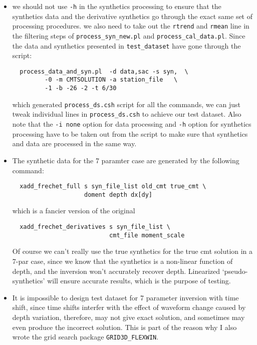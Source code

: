 \documentclass[12pt,titlepage,fleqn]{article}
\begin{document}
\begin{itemize}
\item  we should not use \verb=-h= in the synthetics processing to ensure that the synthetics data and the derivative synthetics go through the exact same set of processing procedures. we also need to take out the \verb=rtrend= and \verb=rmean= line in the filtering steps of \verb=process_syn_new.pl= and \verb=process_cal_data.pl=. Since the data and synthetics presented in \verb=test_dataset= have gone through the script:
\begin{verbatim}
  process_data_and_syn.pl  -d data,sac -s syn,  \  
         -0 -m CMTSOLUTION -a station_file   \
         -1 -b -26 -2 -t 6/30
\end{verbatim}
which generated \verb=process_ds.csh= script for all the commands, we can just tweak individual lines in \verb=process_ds.csh= to achieve our test dataset. Also
note that the \verb=-i none= option for data processing and \verb=-h= option for synthetics processing have to be taken out from the script to make sure that synthetics and data are processed in the same way.

\item The synthetic data for the 7 paramter case are generated by the following command:
\begin{verbatim} 
  xadd_frechet_full s syn_file_list old_cmt true_cmt \
                    doment depth dx[dy]
\end{verbatim}
which is a fancier version of the original
\begin{verbatim}
  xadd_frechet_derivatives s syn_file_list \
                           cmt_file moment_scale
\end{verbatim}
Of course we can't really use the true synthetics for the true cmt solution in a 7-par case, since we know that the synthetics is a non-linear function of depth, and the inversion won't accurately recover depth. Linearized `pseudo-synthetics' will ensure accurate results, which is the purpose of testing.

\item It is impossible to design test dataset for 7 parameter inversion with time shift, since time shifts interfer with the effect of waveform change caused by depth variation, therefore, may not give exact solution, and sometimes may even produce the incorrect solution. This is part of the reason why I also wrote the grid search package \verb=GRID3D_FLEXWIN=.
\end{itemize}
\end{document}
